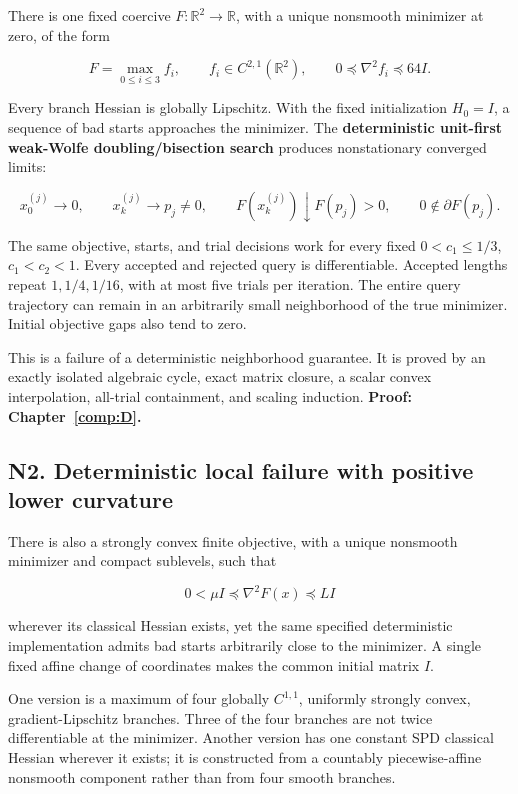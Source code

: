 There is one fixed coercive \(F:\mathbb R^2\to\mathbb R\), with a unique nonsmooth minimizer at zero, of the form

\[
 F=\max_{0\le i\le3}f_i,\qquad f_i\in C^{2,1}(\mathbb R^2),\qquad
 0\preceq\nabla^2f_i\preceq64I.
\]

Every branch Hessian is globally Lipschitz. With the fixed initialization \(H_0=I\), a sequence of bad starts approaches the minimizer. The \textbf{deterministic unit-first weak-Wolfe doubling/bisection search} produces nonstationary converged limits:

\[
 x_0^{(j)}\to0,\qquad x_k^{(j)}\to p_j\ne0,\qquad
 F(x_k^{(j)})\downarrow F(p_j)>0,\qquad0\notin\partial F(p_j).
\]

The same objective, starts, and trial decisions work for every fixed \(0<c_1\le1/3\), \(c_1<c_2<1\). Every accepted and rejected query is differentiable. Accepted lengths repeat \(1,1/4,1/16\), with at most five trials per iteration. The entire query trajectory can remain in an arbitrarily small neighborhood of the true minimizer. Initial objective gaps also tend to zero.

This is a failure of a deterministic neighborhood guarantee. It is proved by an exactly isolated algebraic cycle, exact matrix closure, a scalar convex interpolation, all-trial containment, and scaling induction. \textbf{Proof: Chapter~\ref{comp:D}.}



\subsection{N2. Deterministic local failure with positive lower curvature}\label{n2.-deterministic-local-failure-with-positive-lower-curvature}

There is also a strongly convex finite objective, with a unique nonsmooth minimizer and compact sublevels, such that

\[
 0<\mu I\preceq\nabla^2F(x)\preceq LI
\]

wherever its classical Hessian exists, yet the same specified deterministic implementation admits bad starts arbitrarily close to the minimizer. A single fixed affine change of coordinates makes the common initial matrix \(I\).

One version is a maximum of four globally \(C^{1,1}\), uniformly strongly convex, gradient-Lipschitz branches. Three of the four branches are not twice differentiable at the minimizer. Another version has one constant SPD classical Hessian wherever it exists; it is constructed from a countably piecewise-affine nonsmooth component rather than from four smooth branches.


